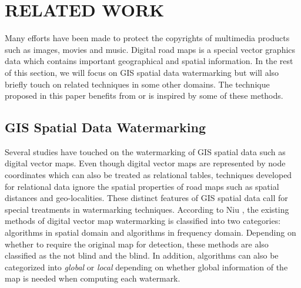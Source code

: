 \section{RELATED WORK}
\label{sec:related}
Many efforts have been made to protect the copyrights of 
multimedia products such as images, movies and music. 
Digital road maps is a special vector graphics data which contains important
geographical and spatial information. In the rest of this section, we will
focus on GIS spatial data watermarking but will also briefly touch on related
techniques in some other domains.
The technique proposed in this paper benefits from or is inspired 
by some of these methods.

\subsection{GIS Spatial Data Watermarking}
Several studies have touched on the watermarking of GIS spatial data such as digital 
vector maps. Even though digital vector maps are represented by node coordinates which 
can also be treated as relational tables, techniques developed for relational data 
ignore the spatial properties of road maps such as spatial distances and geo-localities.
These distinct features of GIS spatial data call for special treatments in watermarking
techniques. According to Niu \cite{Niu06:Survey}, the existing methods of 
digital vector map watermarking is classified into two categories: 
algorithms in spatial domain and algorithms in frequency domain. 
Depending on whether to require the original map 
for detection, these methods are also classified as the not blind and the blind.
In addition, algorithms can also be categorized into {\em global} or {\em local}
depending on whether global information of the map is needed when computing each
watermark.

